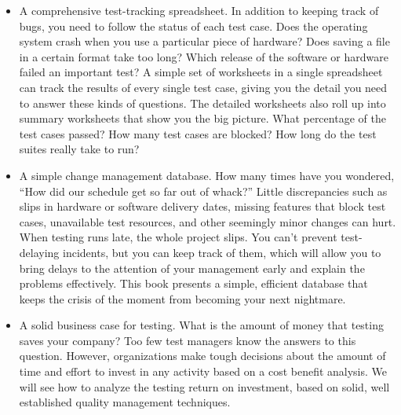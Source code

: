 \begin{itemize}
    \item A comprehensive test-tracking spreadsheet. In addition to keeping track of bugs, you need to follow the status of each test case. Does the operating system crash when you use a particular piece of hardware? Does saving a file in a certain format take too long? Which release of the software or hardware failed an important test? A simple set of worksheets in a single spreadsheet can track the results of every single test case, giving you the detail you need to answer these kinds of questions. The detailed worksheets also roll up into summary worksheets that show you the big picture. What percentage of the test cases passed? How many test cases are blocked? How long do the test suites really take to run?

    \item A simple change management database. How many times have you wondered, “How did our schedule get so far out of whack?” Little discrepancies such as slips in hardware or software delivery dates, missing features that block test cases, unavailable test resources, and other seemingly minor changes can hurt. When testing runs late, the whole project slips. You can't prevent test-delaying incidents, but you can keep track of them, which will allow you to bring delays to the attention of your management early and explain the problems effectively. This book presents a simple, efficient database that keeps the crisis of the moment from becoming your next nightmare.

    \item A solid business case for testing. What is the amount of money that testing saves your company? Too few test managers know the answers to this question. However, organizations make tough decisions about the amount of time and effort to invest in any activity based on a cost benefit analysis. We will see how to analyze the testing return on investment, based on solid, well established quality management techniques.


\end{itemize}
